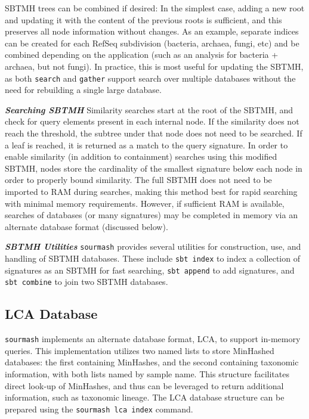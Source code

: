 \documentclass[10pt,a4paper,twocolumn]{article}
\begin{document}
SBTMH trees can be combined if desired: In the simplest case, adding a new root and updating it with the content of the previous roots is sufficient, and this preserves all node information without changes. As an example, separate indices can be created for each RefSeq subdivision (bacteria, archaea, fungi, etc) and be combined depending on the application (such as an analysis for bacteria + archaea, but not fungi). In practice, this is most useful for updating the SBTMH, as both \lstinline{search} and  \lstinline{gather} support search over multiple databases without the need for rebuilding a single large database.

\textit{\textbf{Searching SBTMH}} Similarity searches start at the root of the SBTMH, and check for query elements present in each internal node. If the similarity does not reach the threshold, the subtree under that node does not need to be searched. If a leaf is reached, it is returned as a match to the query signature. In order to enable similarity (in addition to containment) searches using this modified SBTMH, nodes store the cardinality of the smallest signature below each node in order to properly bound similarity. The full SBTMH does not need to be imported to RAM during searches, making this method best for rapid searching with minimal memory requirements. However, if sufficient RAM is available, searches of databases (or many signatures) may be completed in memory via an alternate database format (discussed below). 

\textit{\textbf{SBTMH Utilities}} \lstinline{sourmash} provides several utilities for construction, use, and handling of SBTMH databases. These include \lstinline{sbt index} to index a collection of signatures as an SBTMH for fast searching, \lstinline{sbt append} to add signatures, and \lstinline{sbt combine} to join two SBTMH databases.

\subsection*{LCA Database}

\lstinline{sourmash} implements an alternate database format, LCA, to support in-memory queries. This implementation utilizes two named lists to store MinHashed databases: the first containing MinHashes, and the second containing taxonomic information, with both lists named by sample name. This structure facilitates direct look-up of MinHashes, and thus can be leveraged to return additional information, such as taxonomic lineage. The LCA database structure can be prepared using the \lstinline{sourmash lca index} command.
\end{document}

